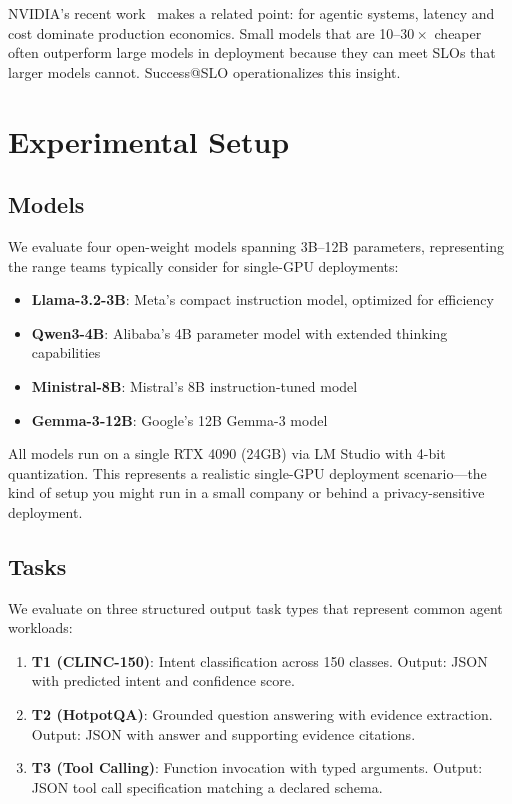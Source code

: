\documentclass[11pt]{article}
\begin{document}
NVIDIA's recent work~\citep{nvidia2025slm} makes a related point: for agentic systems, latency and cost dominate production economics.
Small models that are 10--$30\times$ cheaper often outperform large models in deployment because they can meet SLOs that larger models cannot.
Success@SLO operationalizes this insight.

\section{Experimental Setup}
\label{sec:setup}

\subsection{Models}

We evaluate four open-weight models spanning 3B--12B parameters, representing the range teams typically consider for single-GPU deployments:

\begin{itemize}[leftmargin=12pt]
    \item \textbf{Llama-3.2-3B}: Meta's compact instruction model, optimized for efficiency
    \item \textbf{Qwen3-4B}: Alibaba's 4B parameter model with extended thinking capabilities
    \item \textbf{Ministral-8B}: Mistral's 8B instruction-tuned model
    \item \textbf{Gemma-3-12B}: Google's 12B Gemma-3 model
\end{itemize}

All models run on a single RTX 4090 (24GB) via LM Studio with 4-bit quantization.
This represents a realistic single-GPU deployment scenario---the kind of setup you might run in a small company or behind a privacy-sensitive deployment.

\subsection{Tasks}

We evaluate on three structured output task types that represent common agent workloads:

\begin{enumerate}[leftmargin=12pt]
    \item \textbf{T1 (CLINC-150)}: Intent classification across 150 classes. Output: JSON with predicted intent and confidence score.
    \item \textbf{T2 (HotpotQA)}: Grounded question answering with evidence extraction. Output: JSON with answer and supporting evidence citations.
    \item \textbf{T3 (Tool Calling)}: Function invocation with typed arguments. Output: JSON tool call specification matching a declared schema.
\end{enumerate}
\end{document}
